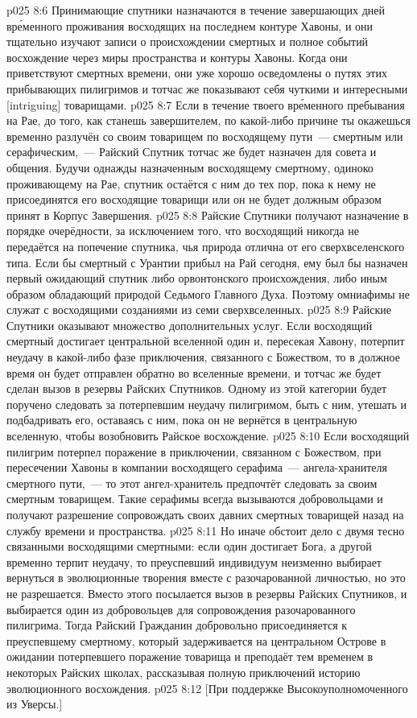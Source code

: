 \vs p025 8:6 Принимающие спутники назначаются в течение завершающих дней вр\'еменного проживания восходящих на последнем контуре Хавоны, и они тщательно изучают записи о происхождении смертных и полное событий восхождение через миры пространства и контуры Хавоны. Когда они приветствуют смертных времени, они уже хорошо осведомлены о путях этих прибывающих пилигримов и тотчас же показывают себя чуткими и интересными [intriguing] товарищами.
\vs p025 8:7 Если в течение твоего вр\'еменного пребывания на Рае, до того, как станешь завершителем, по какой\hyp{}либо причине ты окажешься временно разлучён со своим товарищем по восходящему пути~--- смертным или серафическим,~--- Райский Спутник тотчас же будет назначен для совета и общения. Будучи однажды назначенным восходящему смертному, одиноко проживающему на Рае, спутник остаётся с ним до тех пор, пока к нему не присоединятся его восходящие товарищи или он не будет должным образом принят в Корпус Завершения.
\vs p025 8:8 \pc Райские Спутники получают назначение в порядке очерёдности, за исключением того, что восходящий никогда не передаётся на попечение спутника, чья природа отлична от его сверхвселенского типа. Если бы смертный с Урантии прибыл на Рай сегодня, ему был бы назначен первый ожидающий спутник либо орвонтонского происхождения, либо иным образом обладающий природой Седьмого Главного Духа. Поэтому омниафимы не служат с восходящими созданиями из семи сверхвселенных.
\vs p025 8:9 \pc Райские Спутники оказывают множество дополнительных услуг. Если восходящий смертный достигает центральной вселенной один и, пересекая Хавону, потерпит неудачу в какой\hyp{}либо фазе приключения, связанного с Божеством, то в должное время он будет отправлен обратно во вселенные времени, и тотчас же будет сделан вызов в резервы Райских Спутников. Одному из этой категории будет поручено следовать за потерпевшим неудачу пилигримом, быть с ним, утешать и подбадривать его, оставаясь с ним, пока он не вернётся в центральную вселенную, чтобы возобновить Райское восхождение.
\vs p025 8:10 Если восходящий пилигрим потерпел поражение в приключении, связанном с Божеством, при пересечении Хавоны в компании восходящего серафима~--- ангела\hyp{}хранителя смертного пути,~--- то этот ангел\hyp{}хранитель предпочтёт следовать за своим смертным товарищем. Такие серафимы всегда вызываются добровольцами и получают разрешение сопровождать своих давних смертных товарищей назад на службу времени и пространства.
\vs p025 8:11 Но иначе обстоит дело с двумя тесно связанными восходящими смертными: если один достигает Бога, а другой временно терпит неудачу, то преуспевший индивидуум неизменно выбирает вернуться в эволюционные творения вместе с разочарованной личностью, но это не разрешается. Вместо этого посылается вызов в резервы Райских Спутников, и выбирается один из добровольцев для сопровождения разочарованного пилигрима. Тогда Райский Гражданин добровольно присоединяется к преуспевшему смертному, который задерживается на центральном Острове в ожидании потерпевшего поражение товарища и преподаёт тем временем в некоторых Райских школах, рассказывая полную приключений историю эволюционного восхождения.
\vsetoff
\vs p025 8:12 [При поддержке Высокоуполномоченного из Уверсы.]
\quizlink
